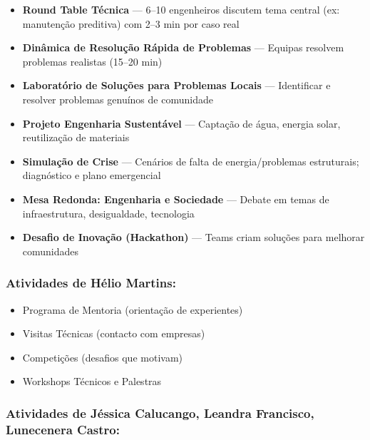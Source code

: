 \documentclass[12pt,a4paper]{article}
\begin{document}
\begin{itemize}[itemsep=0.2cm]
    \item \textbf{Round Table Técnica} — 6–10 engenheiros discutem tema central (ex: manutenção preditiva) com 2–3 min por caso real
    
    \item \textbf{Dinâmica de Resolução Rápida de Problemas} — Equipas resolvem problemas realistas (15–20 min)
    
    \item \textbf{Laboratório de Soluções para Problemas Locais} — Identificar e resolver problemas genuínos de comunidade
    
    \item \textbf{Projeto Engenharia Sustentável} — Captação de água, energia solar, reutilização de materiais
    
    \item \textbf{Simulação de Crise} — Cenários de falta de energia/problemas estruturais; diagnóstico e plano emergencial
    
    \item \textbf{Mesa Redonda: Engenharia e Sociedade} — Debate em temas de infraestrutura, desigualdade, tecnologia
    
    \item \textbf{Desafio de Inovação (Hackathon)} — Teams criam soluções para melhorar comunidades
\end{itemize}

\subsubsection*{Atividades de Hélio Martins:}

\begin{itemize}[itemsep=0.15cm]
    \item Programa de Mentoria (orientação de experientes)
    \item Visitas Técnicas (contacto com empresas)
    \item Competições (desafios que motivam)
    \item Workshops Técnicos e Palestras
\end{itemize}

\subsubsection*{Atividades de Jéssica Calucango, Leandra Francisco, Lunecenera Castro:}
\end{document}
